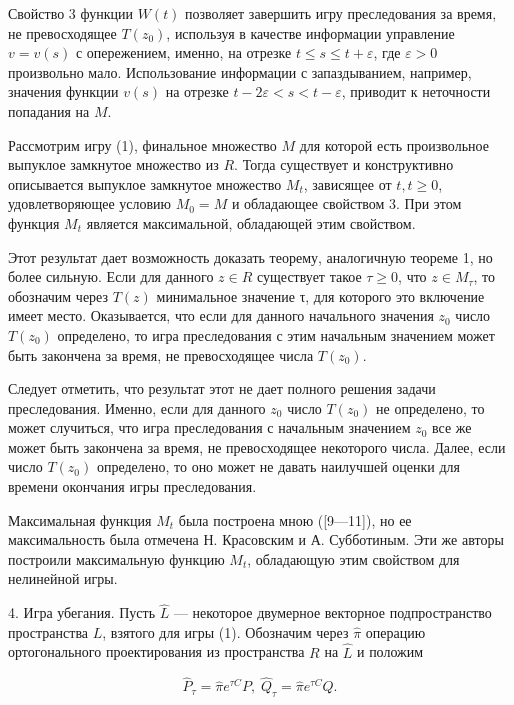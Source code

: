 \documentclass[10pt]{article}
\begin{document}
Свойство 3 функции \(W(t)\) позволяет завершить игру преследования за время, не превосходящее \(T\left( {z}_{0}\right)\), используя в качестве информации управление \(v = v\left( s\right)\) с опережением, именно, на отрезке \(t \leq  s \leq  t + \varepsilon\), где \(\varepsilon  > 0\) произвольно мало. Использование информации с запаздыванием, например, значения функции \(v\left( s\right)\) на отрезке \(t - 2\varepsilon < s < t - \varepsilon\), приводит к неточности попадания на \(M\).

Рассмотрим игру (1), финальное множество \(M\) для которой есть произвольное выпуклое замкнутое множество из \(R\). Тогда существует и конструктивно описывается выпуклое замкнутое множество \({M}_{t}\), зависящее от \(t, t \geq  0\), удовлетворяющее условию \({M}_{0} = M\) и обладающее свойством 3. При этом функция \({M}_{t}\) является максимальной, обладающей этим свойством.

Этот результат дает возможность доказать теорему, аналогичную теореме 1, но более сильную. Если для данного \(z \in R\) существует такое \(\tau \geq 0\), что \(z \in  {M}_{\tau }\), то обозначим через \(T\left( z\right)\) минимальное значение τ, для которого это включение имеет место. Оказывается, что если для данного начального значения \({z}_{0}\) число \(T\left( {z}_{0}\right)\) определено, то игра преследования с этим начальным значением может быть закончена за время, не превосходящее числа \(T\left({z}_{0}\right)\).

Следует отметить, что результат этот не дает полного решения задачи преследования. Именно, если для данного \(z_{0}\) число \(T\left({z}_{0}\right)\) не определено, то может случиться, что игра преследования с начальным значением \(z_{0}\) все же может быть закончена за время, не превосходящее некоторого числа. Далее, если число \(T\left( {z}_{0}\right)\) определено, то оно может не давать наилучшей оценки для времени окончания игры преследования.

Максимальная функция \({M}_{t}\) была построена мною ([9—11]), но ее максимальность была отмечена Н. Красовским и А. Субботиным. Эти же авторы построили максимальную функцию \({M}_{t}\), обладающую этим свойством для нелинейной игры.

4. Игра убегания. Пусть \(\widehat{L}\) — некоторое двумерное векторное подпространство пространства \(L\), взятого для игры (1). Обозначим через \(\widehat{\pi}\) операцию ортогонального проектирования из пространства \(R\) на \(\widehat{L}\) и положим

\[
{\widehat{P}}_{\tau } = \widehat{\pi }{e}^{\tau C}P,\;{\widehat{Q}}_{\tau } = \widehat{\pi }{e}^{\tau C}Q. \tag{14}
\]
\end{document}

